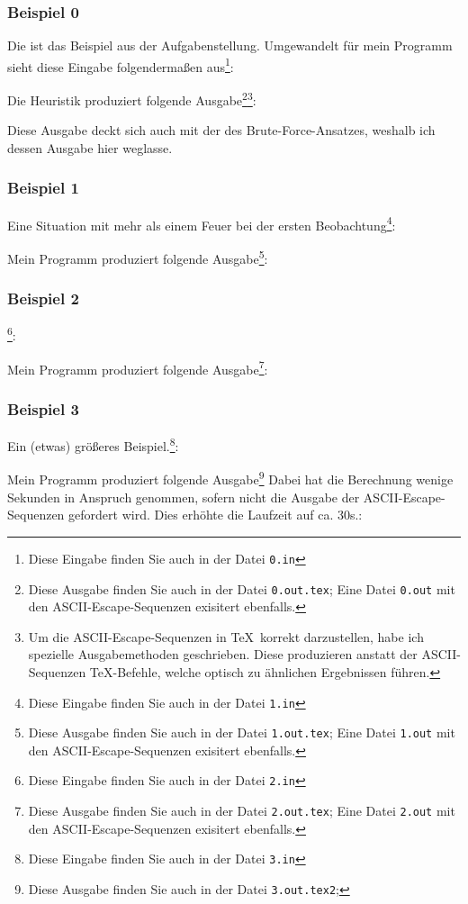 \subsubsection{Beispiel 0}
Die ist das Beispiel aus der Aufgabenstellung. Umgewandelt für mein Programm sieht diese Eingabe folgendermaßen aus\footnote{Diese Eingabe finden Sie auch in der Datei \texttt{0.in}}:
{\small

}
Die Heuristik produziert folgende Ausgabe\footnote{Diese Ausgabe finden Sie auch in der Datei \texttt{0.out.tex}; Eine Datei \texttt{0.out} mit den ASCII-Escape-Sequenzen exisitert ebenfalls.}\footnote{Um die ASCII-Escape-Sequenzen in \TeX\, korrekt darzustellen, habe ich spezielle Ausgabemethoden geschrieben. Diese produzieren anstatt der ASCII-Sequenzen \TeX -Befehle, welche optisch zu ähnlichen Ergebnissen führen.}:\\
{\ttfamily \small

}

Diese Ausgabe deckt sich auch mit der des Brute-Force-Ansatzes, weshalb ich dessen Ausgabe hier weglasse.

\subsubsection{Beispiel 1}
Eine Situation mit mehr als einem Feuer bei der ersten Beobachtung\footnote{Diese Eingabe finden Sie auch in der Datei \texttt{1.in}}:
{\small

}
Mein Programm produziert folgende Ausgabe\footnote{Diese Ausgabe finden Sie auch in der Datei \texttt{1.out.tex}; Eine Datei \texttt{1.out} mit den ASCII-Escape-Sequenzen exisitert ebenfalls.}:\\
{\ttfamily \small

}
\subsubsection{Beispiel 2}
\footnote{Diese Eingabe finden Sie auch in der Datei \texttt{2.in}}:
{\small

}
Mein Programm produziert folgende Ausgabe\footnote{Diese Ausgabe finden Sie auch in der Datei \texttt{2.out.tex}; Eine Datei \texttt{2.out} mit den ASCII-Escape-Sequenzen exisitert ebenfalls.}:\\
{\ttfamily \small

}
\subsubsection{Beispiel 3}
Ein (etwas) größeres Beispiel.\footnote{Diese Eingabe finden Sie auch in der Datei \texttt{3.in}}:
{\small

}
Mein Programm produziert folgende Ausgabe\footnote{Diese Ausgabe finden Sie auch in der Datei \texttt{3.out.tex2};} Dabei hat die Berechnung wenige Sekunden in Anspruch genommen, sofern nicht die Ausgabe der ASCII-Escape-Sequenzen gefordert wird. Dies erhöhte die Laufzeit auf ca. 30s.:\\
{\ttfamily \small

}


